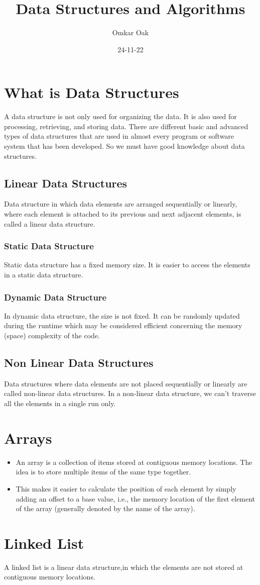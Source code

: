 \documentclass{article}
\title{Data Structures and Algorithms}
\author{Omkar Oak}
\date{24-11-22}
\begin{document}
\maketitle
\tableofcontents
\newpage
\section{What is Data Structures}
A data structure is not only used for organizing the data. It is also used for processing, retrieving, and storing data. There are different basic and advanced types of data structures that are used in almost every program or software system that has been developed. So we must have good knowledge about data structures.
\subsection{Linear Data Structures}
Data structure in which data elements are arranged sequentially or linearly, where each element is attached to its previous and next adjacent elements, is called a linear data structure. 
\subsubsection{Static Data Structure}
Static data structure has a fixed memory size. It is easier to access the elements in a static data structure. 
 \subsubsection{Dynamic Data Structure}
In dynamic data structure, the size is not fixed. It can be randomly updated during the runtime which may be considered efficient concerning the memory (space) complexity of the code. 
\subsection{Non Linear Data Structures}
Data structures where data elements are not placed sequentially or linearly are called non-linear data structures. In a non-linear data structure, we can’t traverse all the elements in a single run only.
\newpage
\section{Arrays} 
\begin{itemize}
\item An array is a collection of items stored at contiguous memory locations. The idea is to store multiple items of the same type together.
\item This makes it easier to calculate the position of each element by simply adding an offset to a base value, i.e., the memory location of the first element of the array (generally denoted by the name of the array).
\end{itemize}
\section{Linked List}
A linked list is a linear data structure,in which the elements are not stored at contiguous memory locations.
\end{document}
